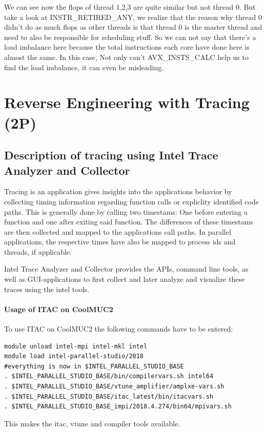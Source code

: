 \documentclass[article]{scrartcl}
\begin{document}
We can see now the flops of thread 1,2,3 are quite similar but not thread 0. But take a look at INSTR\_RETIRED\_ANY,
we realize that the reason why thread 0 didn't do as much flops as other threads is that thread 0 is the master thread and need to also be responsible for scheduling stuff.
So we can not say that there's a load imbalance here because the total instructions each core have done here is almost the same.
In this case, Not only can't AVX\_INSTS\_CALC help us to find the load imbalance, it can even be misleading.

\section{Reverse Engineering with Tracing (2P)}

\subsection{Description of tracing using Intel Trace Analyzer and Collector}
Tracing is an application gives insights into the applications behavior by collecting timing information 
regarding  function calls or expliclity identified code paths.
This is generally done by calling two timestams: One before entering a function and one after exiting said function.
The differences of these timestams are then collected and mapped to the applications call paths.
In parallel applications, the respective times have also be mapped to process ids and threads, if applicable.

Intel Trace Analyzer and Collector provides the APIs, command line tools, as well as GUI-applications to first collect and later analyze and visualize these traces using the intel tools.

\paragraph{Usage of ITAC on CoolMUC2}
To use ITAC on CoolMUC2 the following commands have to be entered:
\begin{verbatim}
module unload intel-mpi intel-mkl intel
module load intel-parallel-studio/2018
#everything is now in $INTEL_PARALLEL_STUDIO_BASE
. $INTEL_PARALLEL_STUDIO_BASE/bin/compilervars.sh intel64
. $INTEL_PARALLEL_STUDIO_BASE/vtune_amplifier/amplxe-vars.sh
. $INTEL_PARALLEL_STUDIO_BASE/itac_latest/bin/itacvars.sh
. $INTEL_PARALLEL_STUDIO_BASE_impi/2018.4.274/bin64/mpivars.sh
\end{verbatim}
This makes the itac, vtune and compiler tools available.
\end{document}
